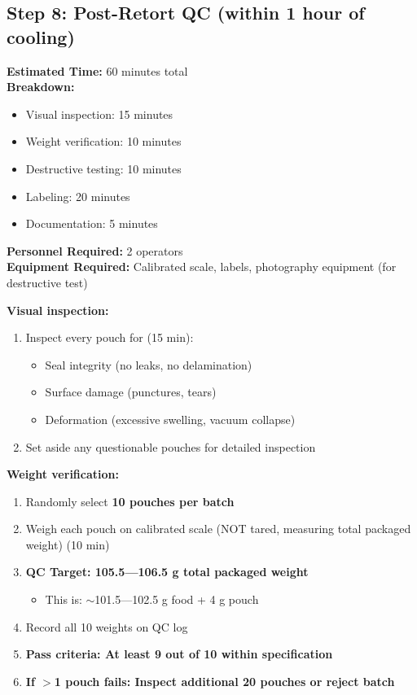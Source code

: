 {%

\subsection*{Step 8: Post-Retort QC (within 1 hour of cooling)}

\textbf{Estimated Time:} 60 minutes total \\
\textbf{Breakdown:}
\begin{itemize}
\item Visual inspection: 15 minutes
\item Weight verification: 10 minutes
\item Destructive testing: 10 minutes
\item Labeling: 20 minutes
\item Documentation: 5 minutes
\end{itemize}
\textbf{Personnel Required:} 2 operators \\
\textbf{Equipment Required:} Calibrated scale, labels, photography equipment (for destructive test)

\vspace{0.5em}
\textbf{Visual inspection:}
\begin{enumerate}[leftmargin=1.5em]
\textbf{Log Start Time in Timesheet:} \_\_\_\_\_
\textbf Ensure less than 5 minutes between End Time in Step 7 and Start Time in Step 8. 
\item Inspect every pouch for (15 min):
  \begin{itemize}
  \item Seal integrity (no leaks, no delamination)
  \item Surface damage (punctures, tears)
  \item Deformation (excessive swelling, vacuum collapse)
  \end{itemize}
\item Set aside any questionable pouches for detailed inspection
\end{enumerate}

\textbf{Weight verification:}
\begin{enumerate}[resume,leftmargin=1.5em]
\item Randomly select \textbf{10 pouches per batch}
\item Weigh each pouch on calibrated scale (NOT tared, measuring total packaged weight) (10 min)
\item \textbf{QC Target: 105.5---106.5 g total packaged weight}
  \begin{itemize}
  \item This is: $\sim$101.5---102.5 g food + 4 g pouch
  \end{itemize}
\item Record all 10 weights on QC log
\item \textbf{Pass criteria: At least 9 out of 10 within specification}
\item \textbf{If $>$1 pouch fails: Inspect additional 20 pouches or reject batch}
\end{enumerate}

}
